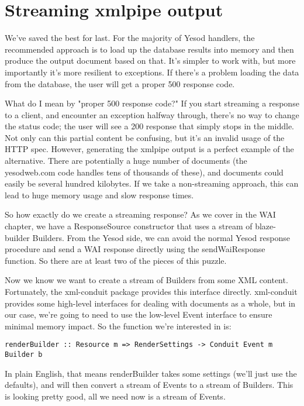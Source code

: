 \section{Streaming xmlpipe output} %

We've saved the best for last. For the majority of Yesod handlers, the recommended approach is to load up the database results into memory and then produce the output document based on that. It's simpler to work with, but more importantly it's more resilient to exceptions. If there's a problem loading the data from the database, the user will get a proper 500 response code.

What do I mean by "proper 500 response code?" If you start streaming a response to a client, and encounter an exception halfway through, there's no way to change the status code; the user will see a 200 response that simply stops in the middle. Not only can this partial content be confusing, but it's an invalid usage of the HTTP spec.
However, generating the xmlpipe output is a perfect example of the alternative. There are potentially a huge number of documents (the yesodweb.com code handles tens of thousands of these), and documents could easily be several hundred kilobytes. If we take a non-streaming approach, this can lead to huge memory usage and slow response times.

So how exactly do we create a streaming response? As we cover in the WAI chapter, we have a ResponseSource constructor that uses a stream of blaze-builder Builders. From the Yesod side, we can avoid the normal Yesod response procedure and send a WAI response directly using the sendWaiResponse function. So there are at least two of the pieces of this puzzle.

Now we know we want to create a stream of Builders from some XML content. Fortunately, the xml-conduit package provides this interface directly. xml-conduit provides some high-level interfaces for dealing with documents as a whole, but in our case, we're going to need to use the low-level Event interface to ensure minimal memory impact. So the function we're interested in is:

\begin{lstlisting}
renderBuilder :: Resource m => RenderSettings -> Conduit Event m Builder b
\end{lstlisting}

In plain English, that means renderBuilder takes some settings (we'll just use the defaults), and will then convert a stream of Events to a stream of Builders. This is looking pretty good, all we need now is a stream of Events.

